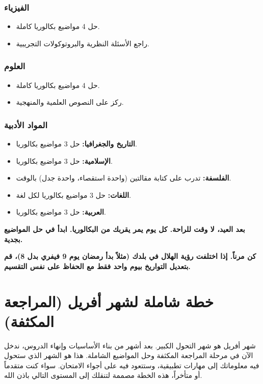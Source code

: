 \documentclass[12pt,a4paper]{book}
\newcommand{\importantAr}[1]{%
	\begin{important}
		\bfseries #1
	\end{important}
}
\begin{document}
	\subsubsection*{الفيزياء}
	\begin{itemize}
		\item حل 4 مواضيع بكالوريا كاملة.
		\item راجع الأسئلة النظرية والبروتوكولات التجريبية.
	\end{itemize}
	
	\subsubsection*{العلوم}
	\begin{itemize}
		\item حل 4 مواضيع بكالوريا كاملة.
		\item ركز على النصوص العلمية والمنهجية.
	\end{itemize}
	
	\subsubsection*{المواد الأدبية}
	\begin{itemize}
		\item \textbf{التاريخ والجغرافيا:} حل 3 مواضيع بكالوريا.
		\item \textbf{الإسلامية:} حل 3 مواضيع بكالوريا.
		\item \textbf{الفلسفة:} تدرب على كتابة مقالتين (واحدة استقصاء، واحدة جدل) بالوقت.
		\item \textbf{اللغات:} حل 3 مواضيع بكالوريا لكل لغة.
		\item \textbf{العربية:} حل 3 مواضيع بكالوريا.
	\end{itemize}
	
	\importantAr{بعد العيد، لا وقت للراحة. كل يوم يمر يقربك من البكالوريا. ابدأ في حل المواضيع بجدية.}
	

	\importantAr{كن مرناً. إذا اختلفت رؤية الهلال في بلدك (مثلاً بدأ رمضان يوم 9 فيفري بدل 8)، قم بتعديل التواريخ بيوم واحد فقط مع الحفاظ على نفس التقسيم.}
	

	
	\section{خطة شاملة لشهر أفريل (المراجعة المكثفة)}
	
	شهر أفريل هو شهر التحول الكبير. بعد أشهر من بناء الأساسيات وإنهاء الدروس، ندخل الآن في مرحلة المراجعة المكثفة وحل المواضيع الشاملة. هذا هو الشهر الذي ستحول فيه معلوماتك إلى مهارات تطبيقية، وستتعود فيه على أجواء الامتحان. سواء كنت متقدماً أو متأخراً، هذه الخطة مصممة لتنقلك إلى المستوى التالي باذن الله.
	
\end{document}
